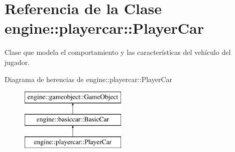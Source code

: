\hypertarget{classengine_1_1playercar_1_1PlayerCar}{
\section{\-Referencia de la \-Clase engine\-:\-:playercar\-:\-:\-Player\-Car}
\label{classengine_1_1playercar_1_1PlayerCar}
}


\-Clase que modela el comportamiento y las características del vehículo del jugador.  


\-Diagrama de herencias de engine\-:\-:playercar\-:\-:\-Player\-Car\begin{figure}[H]
\begin{center}
\leavevmode
\includegraphics[height=3.000000cm]{classengine_1_1playercar_1_1PlayerCar}
\end{center}
\end{figure}
